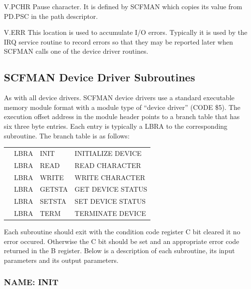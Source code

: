 \documentclass[
]{article}
\newcounter{none} %
\begin{document}
V.PCHR Pause character. It is defined by SCFMAN which copies its value
from PD.PSC in the path descriptor.

V.ERR This location is used to accumulate I/O errors. Typically it is
used by the IRQ service routine to record errors so that they may be
reported later when SCFMAN calls one of the device driver routines.

\subsection{SCFMAN Device Driver Subroutines}

As with all device drivers. SCFMAN device drivers use a standard
executable memory module format with a module type of ``device driver''
(CODE \$5). The execution offset address in the module header points to
a branch table that has six three byte entries. Each entry is typically
a LBRA to the corresponding subroutine. The branch table is as follows:

{\def\LTcaptype{none} %
\begin{longtable}[]{@{}
  >{\raggedright\arraybackslash}p{}
  >{\raggedright\arraybackslash}p{}
  >{\raggedright\arraybackslash}p{}
  >{\raggedright\arraybackslash}p{}@{}}
\toprule\noalign{}
\endhead
\bottomrule\noalign{}
\endlastfoot
\multirow{6}{=}{ENTRY} & LBRA & INIT & INITIALIZE DEVICE \\
& LBRA & READ & READ CHARACTER \\
& LBRA & WRITE & WRITE CHARACTER \\
& LBRA & GETSTA & GET DEVICE STATUS \\
& LBRA & SETSTA & SET DEVICE STATUS \\
& LBRA & TERM & TERMINATE DEVICE \\
\end{longtable}
}

Each subroutine should exit with the condition code register C bit
cleared it no error occured. Otherwise the C bit should be set and an
appropriate error code returned in the B register. Below is a
description of each subroutine, its input parameters and its output
parameters.

\subsubsection{NAME: INIT}
\end{document}

